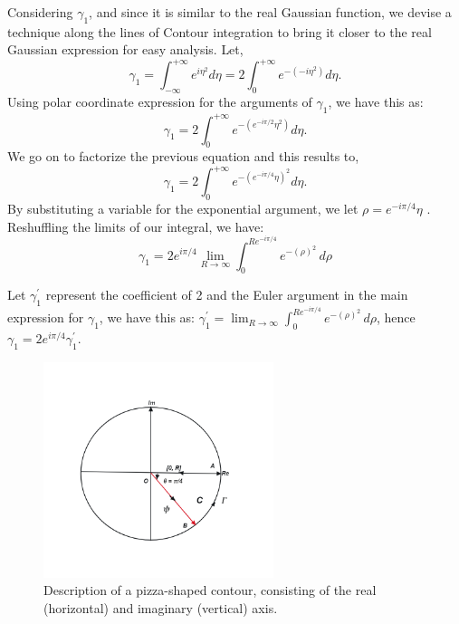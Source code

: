 \documentclass{article}
\begin{document}
Considering $\gamma_{1}$, and since it is similar to the real Gaussian function, we devise a technique along the lines of Contour integration to bring it closer to the real Gaussian expression for easy analysis. Let,
\begin{equation}
    \gamma_{1} = \int_{-\infty}^{+ \infty}e^{i\eta^{2}}d\eta = 2\int_{0}^{+ \infty}e^{-(-i\eta^{2})}d\eta.
\end{equation}
Using polar coordinate expression for the arguments of $\gamma_{1}$, we have this as:
\begin{equation}
    \gamma_{1} = 2\int_{0}^{+ \infty}e^{-(e^{-i\pi/2} \eta^{2})}d\eta.
\end{equation}
We go on to factorize the previous equation and this results to, 
\begin{equation}
    \gamma_{1} = 2\int_{0}^{+ \infty}e^{-(e^{-i\pi/4} \eta)^{2}}d\eta.
\end{equation}
By substituting a variable for the exponential argument, we let $\rho = e^{-i\pi/4} \eta$ \cite{video}. Reshuffling the limits of our integral, we have: 
\begin{equation}
    \gamma_{1} = 2 e^{i\pi/4} \lim_{{R \to \infty}} \int_{0}^{Re^{-i\pi/4}} e^{-(\rho)^{2}} \, d\rho
\end{equation}

Let $\gamma_{1}^{'}$ represent the coefficient of 2 and the Euler argument in the main expression for $\gamma_{1}$, we have this as: $\gamma_{1}^{'} = \lim_{{R \to \infty}} \int_{0}^{Re^{-i\pi/4}} e^{-(\rho)^{2}} \, d\rho$, hence $\gamma_{1} = 2 e^{i\pi/4} \gamma_{1}^{'}$.

\begin{figure}[h] 
\centering
\includegraphics[width=0.6\textwidth]{COUNTOUR_INTEGRATION_DIAGRAM.png}
\caption{ Description of a pizza-shaped contour, consisting of the real (horizontal) and imaginary (vertical) axis.} \label{fig:my_label}
\end{figure}
\end{document}
